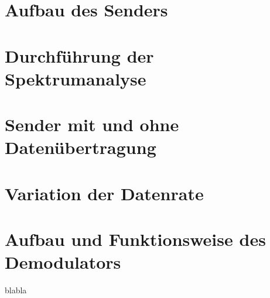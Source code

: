 \section{Aufbau des Senders}
\section{Durchführung der Spektrumanalyse}
\section{Sender mit und ohne Datenübertragung}
\section{Variation der Datenrate}
\section{Aufbau und Funktionsweise des Demodulators}
blabla
\clearpage